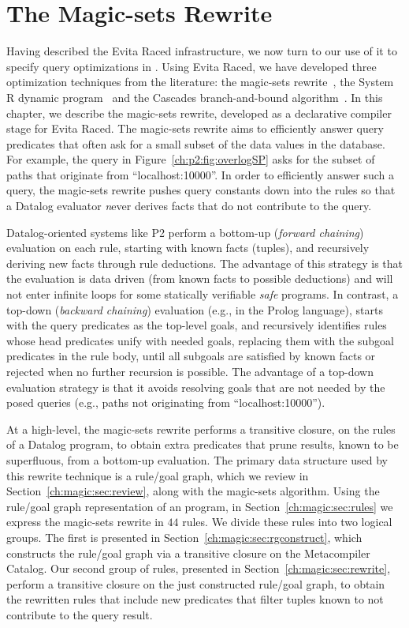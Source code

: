 \chapter[The Magic-sets Rewrite]{The Magic-sets Rewrite}
\label{ch:magic}

Having described the Evita Raced infrastructure, we now turn to our use of it
to specify query optimizations in \OVERLOG.  Using Evita Raced, we have
developed three optimization techniques from the literature: the magic-sets
rewrite~\cite{magic-sets1, magic-sets2}, the System R dynamic
program~\cite{selinger} and the Cascades branch-and-bound
algorithm~\cite{cascades}.  In this chapter, we describe the magic-sets
rewrite, developed as a declarative compiler stage for Evita Raced.  The
magic-sets rewrite aims to efficiently answer query predicates that often ask
for a small subset of the data values in the database.  For example, the
 query in Figure~\ref{ch:p2:fig:overlogSP} asks for the subset of
paths that originate from ``localhost:10000''. In order to efficiently answer such a
query, the magic-sets rewrite pushes query constants down into the rules so
that a Datalog evaluator {\emph never} derives facts that do not contribute to
the query.

Datalog-oriented systems like P2 perform a bottom-up (\emph{forward chaining})
evaluation on each rule, starting with known facts (tuples), and recursively
deriving new facts through rule deductions.  The advantage of this strategy is
that the evaluation is data driven (from known facts to possible deductions)
and will not enter infinite loops for some statically verifiable \emph{safe}
programs.  In contrast, a top-down (\emph{backward chaining}) evaluation (e.g.,
in the Prolog language), starts with the query predicates as the top-level
goals, and recursively identifies rules whose head predicates unify with needed
goals, replacing them with the subgoal predicates in the rule body, until all
subgoals are satisfied by known facts or rejected when no further recursion is
possible.  The advantage of a top-down evaluation strategy is that it avoids
resolving goals that are not needed by the posed queries (e.g., paths not
originating from ``localhost:10000'').

At a high-level, the magic-sets rewrite performs a transitive closure, on the
rules of a Datalog program, to obtain extra predicates that prune results,
known to be superfluous, from a bottom-up evaluation.  The primary data
structure used by this rewrite technique is a rule/goal graph, which we review
in Section~\ref{ch:magic:sec:review}, along with the magic-sets algorithm.
Using the rule/goal graph representation of an \OVERLOG program, in
Section~\ref{ch:magic:sec:rules} we express the magic-sets rewrite in $44$
\OVERLOG rules.  We divide these rules into two logical groups.  The first is
presented in Section~\ref{ch:magic:sec:rgconstruct}, which constructs the
rule/goal graph via a transitive closure on the Metacompiler Catalog.  Our
second group of rules, presented in Section~\ref{ch:magic:sec:rewrite}, perform
a transitive closure on the just constructed rule/goal graph, to obtain the
rewritten rules that include new predicates that filter tuples known to not
contribute to the query result.


